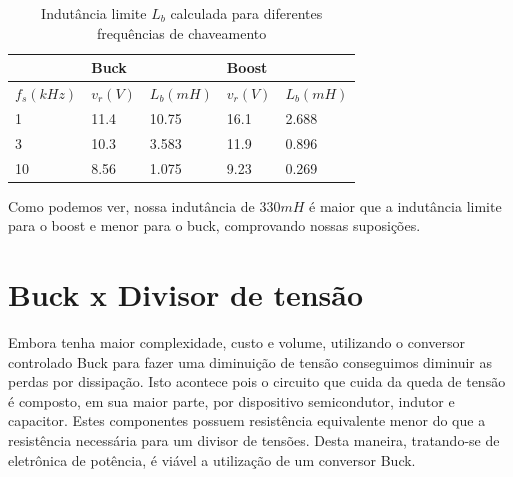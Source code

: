 \documentclass{article}
\begin{document}
\begin{table}[H]
	\centering
	\caption{Indutância limite $L_b$ calculada para diferentes frequências de chaveamento}
	\label{tab:Lb}
	\begin{tabular}{l|l|l|l|l|}
		\cline{2-5}
		& \multicolumn{2}{l|}{Buck} & \multicolumn{2}{l|}{Boost} \\ \hline
		\multicolumn{1}{|l|}{$f_s (kHz)$} & $v_r (V)$      & $L_b (mH)$        & $v_r (V)$      & $L_b (mH)$         \\ \hline
		\multicolumn{1}{|l|}{1}  & 11.4       & 10.75      & 16.1       & 2.688      \\ \hline
		\multicolumn{1}{|l|}{3}  & 10.3       & 3.583     & 11.9       & 0.896      \\ \hline
		\multicolumn{1}{|l|}{10} & 8.56       & 1.075     & 9.23       & 0.269      \\ \hline
	\end{tabular}
\end{table}	

Como podemos ver, nossa indutância de $330mH$ é maior que a indutância limite para o boost e menor para o buck, comprovando nossas suposições.

\section{Buck x Divisor de tensão}

Embora tenha maior complexidade, custo e volume, utilizando o conversor controlado Buck para fazer uma diminuição de tensão conseguimos diminuir as perdas por dissipação. Isto acontece pois o circuito que cuida da queda de tensão é composto, em sua maior parte, por dispositivo semicondutor, indutor e capacitor. Estes componentes possuem resistência equivalente menor do que a resistência necessária para um divisor de tensões. Desta maneira, tratando-se de eletrônica de potência, é viável a utilização de um conversor Buck.


\end{document}
